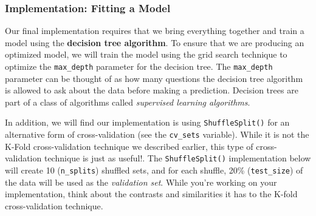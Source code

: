 \documentclass[11pt]{article}
\begin{document}
    \subsubsection{Implementation: Fitting a
Model}\label{implementation-fitting-a-model}

Our final implementation requires that we bring everything together and
train a model using the \textbf{decision tree algorithm}. To ensure that
we are producing an optimized model, we will train the model using the
grid search technique to optimize the
\texttt{\textquotesingle{}max\_depth\textquotesingle{}} parameter for
the decision tree. The
\texttt{\textquotesingle{}max\_depth\textquotesingle{}} parameter can be
thought of as how many questions the decision tree algorithm is allowed
to ask about the data before making a prediction. Decision trees are
part of a class of algorithms called \emph{supervised learning
algorithms}.

In addition, we will find our implementation is using
\texttt{ShuffleSplit()} for an alternative form of cross-validation (see
the \texttt{\textquotesingle{}cv\_sets\textquotesingle{}} variable).
While it is not the K-Fold cross-validation technique we described
earlier, this type of cross-validation technique is just as useful!. The
\texttt{ShuffleSplit()} implementation below will create 10
(\texttt{\textquotesingle{}n\_splits\textquotesingle{}}) shuffled sets,
and for each shuffle, 20\%
(\texttt{\textquotesingle{}test\_size\textquotesingle{}}) of the data
will be used as the \emph{validation set}. While you're working on your
implementation, think about the contrasts and similarities it has to the
K-fold cross-validation technique.
\end{document}
